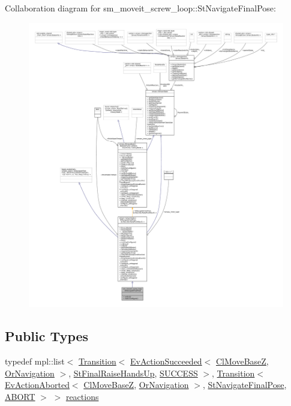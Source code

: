 Collaboration diagram for sm\+\_\+moveit\+\_\+screw\+\_\+loop\+:\+:St\+Navigate\+Final\+Pose\+:
\nopagebreak
\begin{figure}[H]
\begin{center}
\leavevmode
\includegraphics[width=350pt]{structsm__moveit__screw__loop_1_1StNavigateFinalPose__coll__graph}
\end{center}
\end{figure}
\subsection*{Public Types}
\begin{DoxyCompactItemize}
\item 
typedef mpl\+::list$<$ \hyperlink{classsmacc_1_1Transition}{Transition}$<$ \hyperlink{structsmacc_1_1default__events_1_1EvActionSucceeded}{Ev\+Action\+Succeeded}$<$ \hyperlink{classcl__move__base__z_1_1ClMoveBaseZ}{Cl\+Move\+BaseZ}, \hyperlink{classsm__moveit__screw__loop_1_1OrNavigation}{Or\+Navigation} $>$, \hyperlink{structsm__moveit__screw__loop_1_1StFinalRaiseHandsUp}{St\+Final\+Raise\+Hands\+Up}, \hyperlink{structsmacc_1_1default__transition__tags_1_1SUCCESS}{S\+U\+C\+C\+E\+SS} $>$, \hyperlink{classsmacc_1_1Transition}{Transition}$<$ \hyperlink{structsmacc_1_1default__events_1_1EvActionAborted}{Ev\+Action\+Aborted}$<$ \hyperlink{classcl__move__base__z_1_1ClMoveBaseZ}{Cl\+Move\+BaseZ}, \hyperlink{classsm__moveit__screw__loop_1_1OrNavigation}{Or\+Navigation} $>$, \hyperlink{structsm__moveit__screw__loop_1_1StNavigateFinalPose}{St\+Navigate\+Final\+Pose}, \hyperlink{structsmacc_1_1default__transition__tags_1_1ABORT}{A\+B\+O\+RT} $>$ $>$ \hyperlink{structsm__moveit__screw__loop_1_1StNavigateFinalPose_a39c3669c37c3e9622977219a07d50b8a}{reactions}
\end{DoxyCompactItemize}
